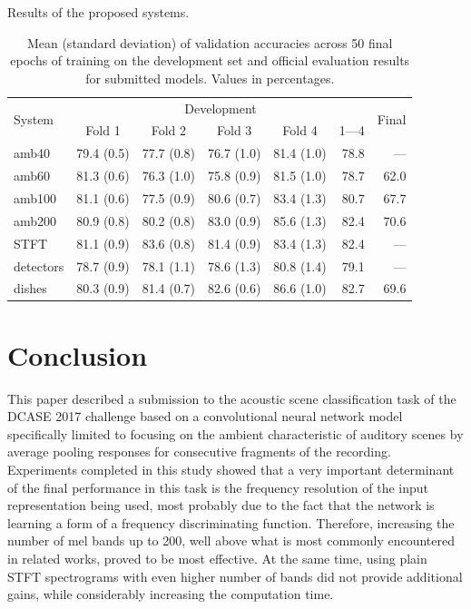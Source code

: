 \documentclass{article}
\begin{document}
\begin{sloppy}
\begin{table}[b]
	\renewcommand{\arraystretch}{1.2}
    \scriptsize
	\centering
    \caption{Results of the proposed systems.}
    \label{tab:results}
     \vspace{-2pt}
    \setlength{\tabcolsep}{0.8em}
	\begin{tabular}{l r r r r r r}
    \toprule
    \multicolumn{1}{l}{\multirow{2}[3]{*}{System}} & \multicolumn{5}{c}{Development} & \multicolumn{1}{c}{\multirow{2}[3]{*}{Final}} \\
    \cmidrule{2-6}
    & \multicolumn{1}{c}{Fold 1} & \multicolumn{1}{c}{Fold 2} & \multicolumn{1}{c}{Fold 3} & \multicolumn{1}{c}{Fold 4} & \multicolumn{1}{c}{1---4} & \\
    \cmidrule{1-1} \cmidrule{2-6} \cmidrule{7-7}
    amb40 & 79.4 (0.5) & 77.7 (0.8) & 76.7 (1.0) & 81.4 (1.0) & 78.8 & --- \\
    amb60 & 81.3 (0.6) & 76.3 (1.0) & 75.8 (0.9) & 81.5 (1.0) & 78.7 & 62.0 \\
    amb100 & 81.1 (0.6) & 77.5 (0.9) & 80.6 (0.7) & 83.4 (1.3) & 80.7 & 67.7 \\
    amb200 & 80.9 (0.8) & 80.2 (0.8) & 83.0 (0.9) & 85.6 (1.3) & 82.4 & 70.6 \\
    STFT & 81.1 (0.9) & 83.6 (0.8) & 81.4 (0.9) & 83.4 (1.3) & 82.4 & --- \\
    detectors & 78.7 (0.9) & 78.1 (1.1) & 78.6 (1.3) & 80.8 (1.4) & 79.1 & --- \\
    dishes & 80.3 (0.9) & 81.4 (0.7) & 82.6 (0.6) & 86.6 (1.0) & 82.7 & 69.6 \\
    \bottomrule
	\end{tabular}
    \vspace{6pt}
    \caption*{\footnotesize Mean (standard deviation) of validation accuracies across 50 final epochs of training on the development set and official evaluation results for submitted models. Values in percentages.}
    \vspace{-6pt}
\end{table}

\section{Conclusion}

This paper described a submission to the acoustic scene classification task of the DCASE 2017 challenge based on a convolutional neural network model specifically limited to focusing on the ambient characteristic of auditory scenes by average pooling responses for consecutive fragments of the recording. Experiments completed in this study showed that a very important determinant of the final performance in this task is the frequency resolution of the input representation being used, most probably due to the fact that the network is learning a form of a frequency discriminating function. Therefore, increasing the number of mel bands up to 200, well above what is most commonly encountered in related works, proved to be most effective. At the same time, using plain STFT spectrograms with even higher number of bands did not provide additional gains, while considerably increasing the computation time.


\end{sloppy}
\end{document}

